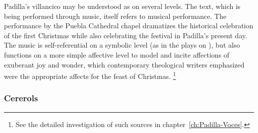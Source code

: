 %
Padilla's villancico may be understood as  on several levels.
The text, which is being performed through music, itself refers to musical performance.
The performance by the Puebla Cathedral chapel dramatizes the historical celebration of the first Christmas while also celebrating the festival in Padilla's present day.
The music is self-referential on a symbolic level (as in the plays on ), but also functions on a more simple affective level to model and incite affections of exuberant joy and wonder, which contemporary theological writers emphasized were the appropriate affects for the feast of Christmas.%
	\footnote{%
	See the detailed investigation of such sources in chapter~\ref{ch:Padilla-Voces}.
	}

\subsubsection{Cererols}

